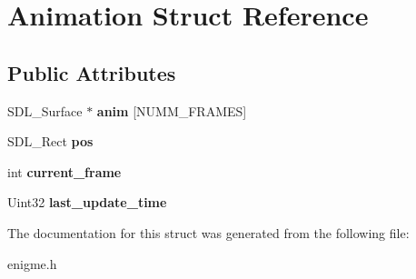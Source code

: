 \hypertarget{structAnimation}{}\section{Animation Struct Reference}
\label{structAnimation}
\subsection*{Public Attributes}
\begin{DoxyCompactItemize}
\item 
\mbox{\label{structAnimation_abcadafb0826ab2f1b734d7a02340b521}} 
S\+D\+L\+\_\+\+Surface $\ast$ {\bfseries anim} \mbox{[}N\+U\+M\+M\+\_\+\+F\+R\+A\+M\+ES\mbox{]}
\item 
\mbox{\label{structAnimation_a0276def21670856a9386c08669149784}} 
S\+D\+L\+\_\+\+Rect {\bfseries pos}
\item 
\mbox{\label{structAnimation_a9e81e6ba78973f963e1f2995f89d57eb}} 
int {\bfseries current\+\_\+frame}
\item 
\mbox{\label{structAnimation_a52b86e7893eb59a8590e94aadde452e2}} 
Uint32 {\bfseries last\+\_\+update\+\_\+time}
\end{DoxyCompactItemize}


The documentation for this struct was generated from the following file\+:\begin{DoxyCompactItemize}
\item 
enigme.\+h\end{DoxyCompactItemize}
